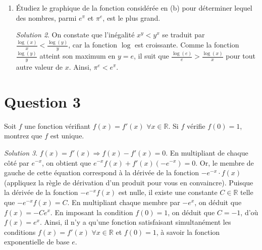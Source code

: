 \documentclass[
  12pt,
  letterpaper,
]{book}
\theoremstyle{remark}
\newtheorem*{solution}{Solution}
\begin{document}
\begin{enumerate}
\begin{solution}
  \begin{figure}[H]

  {\centering \texttt{[image: exercices/ExpoLog/ExpoLog\_files/figure-pdf/unnamed-chunk-1-1.pdf]}

  }

  \end{figure}

  On constate que l'égalité \(x^y=y^x\) est équivalente à l'égalité
  \(\frac{\log(x)}{x}=\frac{\log(y)}{y}\). Ainsi, Comme la fonction est
  strictement décroissante à partir de \(x=e\), il faut qu'une des
  valeurs se trouve avant \(e\) et une autre après \(e\). La seule
  possibilité pour une valeur entière avant \(e\) est \(2\), ce qui
  correspond à la solution trouvée en (a).

  \end{solution}
\item
  Étudiez le graphique de la fonction considérée en (b) pour déterminer
  lequel des nombres, parmi \(e^{\pi}\) et \(\pi^e\), est le plus grand.

  \begin{solution}

  On constate que l'inégalité \(x^y<y^x\) se traduit par
  \(\frac{\log(x)}{x}<\frac{\log(y)}{y}\), car la fonction \(\log\) est
  croissante. Comme la fonction \(\frac{\log(y)}{y}\) atteint son
  maximum en \(y=e\), il suit que
  \(\frac{\log(e)}{e}>\frac{\log(x)}{x}\) pour tout autre valeur de
  \(x\). Ainsi, \(\pi^e<e^{\pi}\).

  \end{solution}
\end{enumerate}

\hypertarget{question-3}{%
\section{Question 3}\label{question-3}}

Soit \(f\) une fonction vérifiant \(f(x)=f'(x)\)
\(\forall x\in\mathbb{R}\). Si \(f\) vérifie \(f(0)=1\), montrez que
\(f\) est unique.

\begin{solution}

\(f(x)=f'(x)\Rightarrow f(x)-f'(x)=0\). En multipliant de chaque côté
par \(e^{-x}\), on obtient que \(e^{-x}f(x)+f'(x)(-e^{-x})=0\). Or, le
membre de gauche de cette équation correspond à la dérivée de la
fonction \(-e^{-x}\cdot f(x)\) (appliquez la règle de dérivation d'un
produit pour vous en convaincre). Puisque la dérivée de la fonction
\(-e^{-x}f(x)\) est nulle, il existe une constante \(C\in\mathbb{R}\)
telle que \(-e^{-x}f(x)=C\). En multipliant chaque membre par \(-e^x\),
on déduit que \(f(x)=-Ce^x\). En imposant la condition \(f(0)=1\), on
déduit que \(C=-1\), d'où \(f(x)=e^x\). Ainsi, il n'y a qu'une fonction
satisfaisant simultanément les conditions \(f(x)=f'(x)\)
\(\forall x\in\mathbb{R}\) et \(f(0)=1\), à savoir la fonction
exponentielle de base \(e\).

\end{solution}
\end{document}

